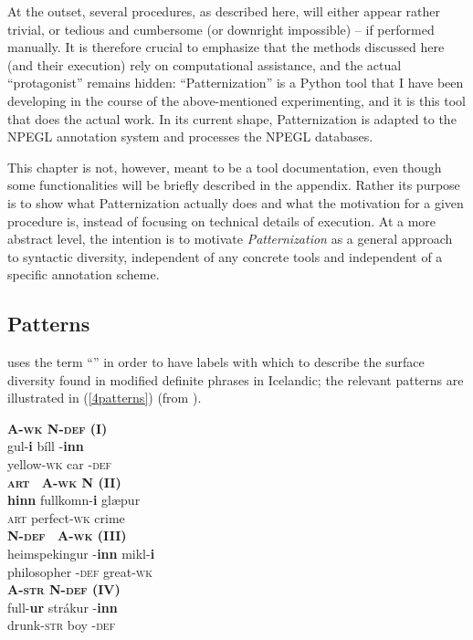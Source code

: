 \documentclass[output=paper,colorlinks,citecolor=brown,draft]{langscibook}
\begin{document}
At the outset, several procedures, as described here,  will either appear rather trivial, or tedious and cumbersome (or downright impossible) -- if performed manually.  It is therefore crucial to emphasize that the methods discussed here (and  their execution) rely on computational assistance, and the actual ``protagonist'' remains hidden: ``{Patternization}'' is a Python tool that I have been developing in the course of the above-mentioned experimenting, and it is this tool that does the actual work. 
In its current shape, {Patternization} is adapted to the NPEGL annotation system and processes the NPEGL databases. 

This chapter is not, however, meant to be a tool documentation, even though some functionalities will be briefly described in the appendix.  Rather its purpose is to show what {Patternization} actually does and what the motivation for a given procedure is, instead of focusing on technical details of execution. At a more abstract level, the intention is to motivate \textit{Patternization} as a general approach to syntactic diversity, independent of any concrete tools and independent of a specific annotation scheme.  


\subsection{Patterns}
\label{sec:patz}

\citet{Pfaff2015,Pfaff2019} uses the term ``''  in order to have labels with which to describe the surface diversity found in modified definite  phrases in Icelandic; the relevant patterns are illustrated in (\ref{4patterns}) (from \citealt[29]{Pfaff2015}).

\begin{exe}
  \ex \label{4patterns} 
        \begin{xlist}
             \ex \textbf{A-\textsc{wk} N-\textsc{def}  \hfill(I)} \\
                \gll gul-\textbf{i} bíll -\textbf{inn}\\
                yellow-\textsc{wk} car -\textsc{def}\\           
             \ex \textbf{\textsc{art} \ A-\textsc{wk} N \hfill(II)} \\
               \gll \textbf{hinn} fullkomn-\textbf{i} glæpur \\ 
               \textsc{art}  perfect-\textsc{wk} crime\\      
            \ex \textbf{N-\textsc{def} \ A-\textsc{wk} \hfill(III)} \\
             \gll heimspekingur -\textbf{inn} mikl-\textbf{i}  \\
              philosopher -\textsc{def} great-\textsc{wk}\\     
             \ex \textbf{A-\textsc{str} N-\textsc{def}  \hfill(IV)} \\  
                \gll full-\textbf{ur} strákur -\textbf{inn} \\
                 drunk-\textsc{str}  boy -\textsc{def}  \\  
\end{xlist}
\end{exe}
\end{document}
